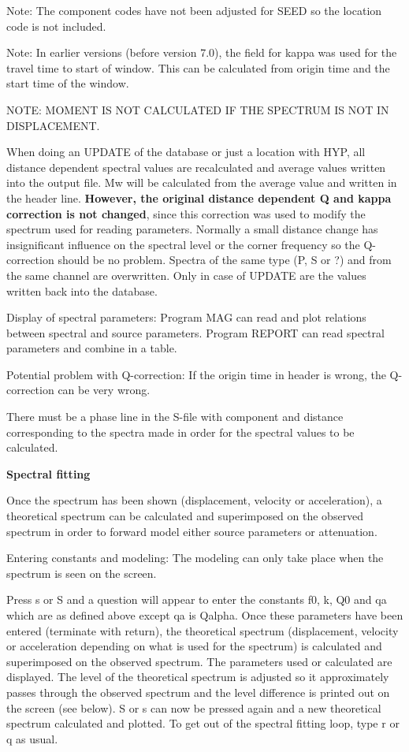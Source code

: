 Note: The component codes have not been adjusted for SEED so the location code is not included. 

Note: In earlier versions (before version 7.0), the field for kappa was used for the travel time to start of window. This can be calculated from origin time and the start time of the window. 

NOTE: MOMENT IS NOT CALCULATED IF THE SPECTRUM IS NOT IN DISPLACEMENT. 

When doing an UPDATE of the database or just a location with HYP, all distance dependent spectral values are recalculated and average values written into the output file. Mw will be calculated from the average value and written in the header line. \textbf{However, the original distance dependent Q and kappa correction is not changed}, since this correction was used to modify the spectrum used for reading parameters. Normally a small distance change has insignificant influence on the spectral level or the corner frequency so the Q-correction should be no problem. Spectra of the same type (P, S or ?) and from the same channel are overwritten. Only in case of UPDATE are the values written back into the database. 

Display of spectral parameters: Program MAG can read and plot relations between spectral and source parameters. Program REPORT can read spectral parameters and combine in a table. 

Potential problem with Q-correction: If the origin time in header is wrong, the Q-correction can be very wrong.  

There must be a phase line in the S-file with component and distance corresponding to the spectra made in order for the spectral values to be calculated. 

\textbf{Spectral fitting}

Once the spectrum has been shown (displacement, velocity or acceleration), a theoretical spectrum can be calculated and superimposed on the observed spectrum in order to forward model either source parameters or attenuation. 

Entering constants and modeling: The modeling can only take place when the spectrum is seen on the screen. 

Press s or S and a question will appear to enter the constants f0, k, Q0 and qa which are as defined above except qa is Qalpha. Once these parameters have been entered (terminate with return), the theoretical spectrum (displacement, velocity or acceleration depending on what is used for the spectrum) is calculated and superimposed on the observed spectrum. The parameters used or calculated are displayed. The level of the theoretical spectrum is adjusted so it approximately passes through the observed spectrum and the level difference is printed out on the screen (see below). S or s can now be pressed again and a new theoretical spectrum calculated and plotted. To get out of the spectral fitting loop, type r or q as usual. 

